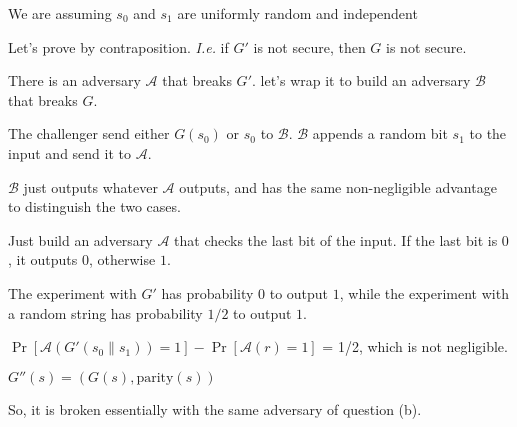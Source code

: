 \begin{tcolorbox}[solutionbox, title=Answer: (a)]

    We are assuming $s_0$ and $s_1$ are uniformly random and independent

    Let's prove by contraposition. \textit{I.e.} if $G'$ is not secure, then $G$ is not secure.

    There is an adversary $\mathcal{A}$ that breaks $G'$. let's wrap it to build an adversary $\mathcal{B}$ that breaks $G$.

    The challenger send either $G(s_0)$ or $s_0$ to $\mathcal{B}$. $\mathcal{B}$ appends a random bit $s_1$ to the input and send it to $\mathcal{A}$.

    $\mathcal{B}$ just outputs whatever $\mathcal{A}$ outputs, and has the same non-negligible advantage to distinguish the two cases.

\end{tcolorbox}

\begin{tcolorbox}[solutionbox, title=Answer: (b)]

    Just build an adversary $\mathcal{A}$ that checks the last bit of the input. If the last bit is $0$, it outputs $0$, otherwise $1$.

    The experiment with $G'$ has probability 0 to output $1$, while the experiment with a random string has probability $1/2$ to output $1$.

    $\Pr[\mathcal{A}(G'(s_0 \| s_1)) = 1] - \Pr[\mathcal{A}(r) = 1]$ = 1/2, which is not negligible.

\end{tcolorbox}


\begin{tcolorbox}[solutionbox, title=Answer: (c)]

    $G''(s) = (G(s), \text{parity}(s))$

    So, it is broken essentially with the same adversary of question (b).

\end{tcolorbox}

